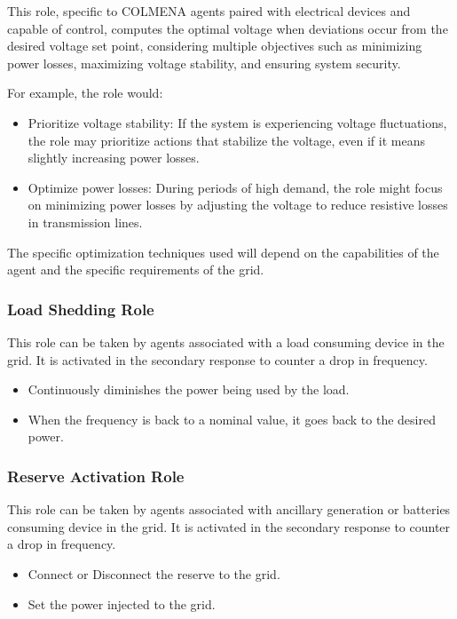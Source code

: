 \documentclass{article}
\begin{document}
This role, specific to COLMENA agents paired with electrical devices and capable of control, computes the optimal voltage when deviations occur from the desired voltage set point, considering multiple objectives such as minimizing power losses, maximizing voltage stability, and ensuring system security.

For example, the role would:

\begin{itemize}
    \item Prioritize voltage stability: If the system is experiencing voltage fluctuations, the role may prioritize actions that stabilize the voltage, even if it means slightly increasing power losses.
    \item Optimize power losses: During periods of high demand, the role might focus on minimizing power losses by adjusting the voltage to reduce resistive losses in transmission lines.
\end{itemize}

The specific optimization techniques used will depend on the capabilities of the agent and the specific requirements of the grid.
\subsubsection*{Load Shedding Role}

This role can be taken by agents associated with a load consuming device in the grid. It is activated in the secondary response to counter a drop in frequency.

\begin{itemize}
    \item Continuously diminishes the power being used by the load.
    \item When the frequency is back to a nominal value, it goes back to the desired power.
\end{itemize}

\subsubsection*{Reserve Activation Role}

This role can be taken by agents associated with ancillary generation or batteries consuming device in the grid. It is activated in the secondary response to counter a drop in frequency.

\begin{itemize}
    \item Connect or Disconnect the reserve to the grid.
    \item Set the power injected to the grid.
\end{itemize}
\end{document}
